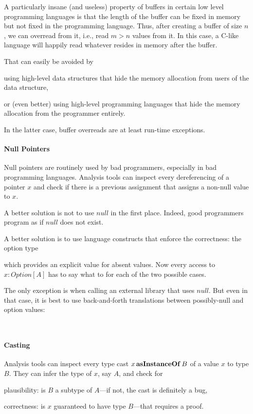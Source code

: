 A particularly insane (and useless) property of buffers in certain low level programming languages is that the length of the buffer can be fixed in memory but not fixed in the programming language.
Thus, after creating a buffer of size $n$, we can overread from it, i.e., read $m>n$ values from it.
In this case, a C-like language will happily read whatever resides in memory after the buffer.

That can easily be avoided by
\begin{compactitem}
 \item using high-level data structures that hide the memory allocation from users of the data structure,
 \item or (even better) using high-level programming languages that hide the memory allocation from the programmer entirely.
\end{compactitem}
In the latter case, buffer overreads are at least run-time exceptions.

\paragraph{Null Pointers}
Null pointers are routinely used by bad programmers, especially in bad programming languages.
Analysis tools can inspect every dereferencing of a pointer $x$ and check if there is a previous assignment that assigns a non-null value to $x$.
\medskip

A better solution is not to use $null$ in the first place.
Indeed, good programmers program as if $null$ does not exist.

A better solution is to use language constructs that enforce the correctness: the option type
\begin{acode}
\end{acode}
which provides an explicit value for absent values.
Now every access to $x:Option[A]$ has to say what to for each of the two possible cases.

The only exception is when calling an external library that uses $null$.
But even in that case, it is best to use back-and-forth translations between possibly-null and option values:
\begin{acode}
\\
\end{acode}

\paragraph{Casting}
Analysis tools can inspect every type cast $x \,\textbf{asInstanceOf}\; B$ of a value $x$ to type $B$.
They can infer the type of $x$, say $A$, and check for
\begin{compactitem}
 \item plausibility: is $B$ a subtype of $A$---if not, the cast is definitely a bug,
 \item correctness: is $x$ guaranteed to have type $B$---that requires a proof.
\end{compactitem}

